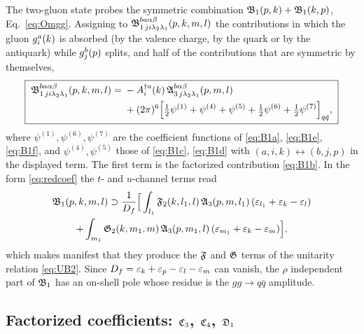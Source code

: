 The two-gluon state probes the symmetric combination $\mathfrak{B}_{1}(p,k)+\mathfrak{B}_{1}(k,p)$,
Eq.~\eqref{eq:Omgg}. Assigning to $\mathfrak{B}^{ba\alpha\beta}_{1\,ji\lambda_{2}\lambda_{1}}(p,k,m,l)$ the
contributions in which the gluon $g^{a}_{i}(k)$ is absorbed (by the valence charge, by the quark or
by the antiquark) while $g^{b}_{j}(p)$ splits, and half of the contributions that are symmetric by
themselves,
\begin{equation}
\boxed{\;
\begin{aligned}
\mathfrak{B}^{ba\alpha\beta}_{1\,ji\lambda_{2}\lambda_{1}}(p,k,m,l)=\;&
-A^{\dagger a}_{i}(k)\,\mathfrak{A}^{b\alpha\beta}_{3\,j\lambda_{2}\lambda_{1}}(p,m,l)
\\&+(2\pi)^{6}\Big[\tfrac12\psi^{(1)}+\psi^{(4)}+\psi^{(5)}+\tfrac12\psi^{(6)}+\tfrac12\psi^{(7)}\Big]_{q\bar q},
\end{aligned}\;}
\label{eq:B1}
\end{equation}
where $\psi^{(1)},\psi^{(6)},\psi^{(7)}$ are the coefficient functions of \eqref{eq:B1a}, \eqref{eq:B1e},
\eqref{eq:B1f}, and $\psi^{(4)},\psi^{(5)}$ those of \eqref{eq:B1c}, \eqref{eq:B1d} with
$(a,i,k)\leftrightarrow(b,j,p)$ in the displayed term. The first term is the factorized
contribution \eqref{eq:B1b}. In the form \eqref{eq:redcoef} the $t$- and $u$-channel terms read
\begin{multline}
\mathfrak{B}_{1}(p,k,m,l)\supset\frac{1}{D_{f}}\Big[\int_{l_{1}}\mathfrak{F}_{2}(k,l_{1},l)\,\mathfrak{A}_{3}(p,m,l_{1})\,(\varepsilon_{l_{1}}+\varepsilon_{k}-\varepsilon_{l})
\\+\int_{m_{1}}\mathfrak{G}_{2}(k,m_{1},m)\,\mathfrak{A}_{3}(p,m_{1},l)\,(\varepsilon_{m_{1}}+\varepsilon_{k}-\varepsilon_{m})\Big],
\label{eq:B1red}
\end{multline}
which makes manifest that they produce the $\mathfrak{F}$ and $\mathfrak{G}$ terms of the unitarity relation
\eqref{eq:UB2}. Since $D_{f}=\varepsilon_{k}+\varepsilon_{p}-\varepsilon_{l}-\varepsilon_{m}$ can vanish, the $\rho$ independent part
of $\mathfrak{B}_{1}$ has an on-shell pole whose residue is the $gg\to q\bar q$ amplitude.

\subsection{Factorized coefficients: $\mathfrak{C}_{3}$, $\mathfrak{C}_{4}$, $\mathfrak{D}_{1}$}

